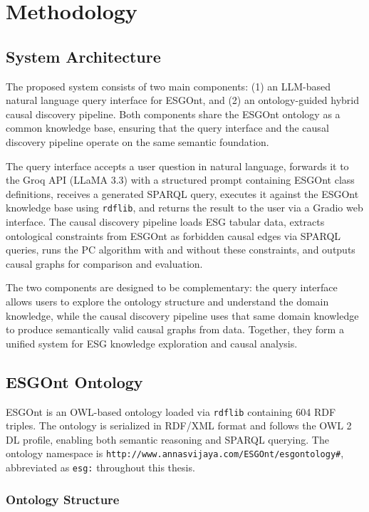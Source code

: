 \documentclass[a4paper,11pt,oneside]{article}
\begin{document}
\section{Methodology}

\subsection{System Architecture}

The proposed system consists of two main components: (1) an LLM-based natural language query interface for ESGOnt, and (2) an ontology-guided hybrid causal discovery pipeline. Both components share the ESGOnt ontology as a common knowledge base, ensuring that the query interface and the causal discovery pipeline operate on the same semantic foundation.

The query interface accepts a user question in natural language, forwards it to the Groq API (LLaMA 3.3) with a structured prompt containing ESGOnt class definitions, receives a generated SPARQL query, executes it against the ESGOnt knowledge base using \texttt{rdflib}, and returns the result to the user via a Gradio web interface. The causal discovery pipeline loads ESG tabular data, extracts ontological constraints from ESGOnt as forbidden causal edges via SPARQL queries, runs the PC algorithm with and without these constraints, and outputs causal graphs for comparison and evaluation.

The two components are designed to be complementary: the query interface allows users to explore the ontology structure and understand the domain knowledge, while the causal discovery pipeline uses that same domain knowledge to produce semantically valid causal graphs from data. Together, they form a unified system for ESG knowledge exploration and causal analysis.

\subsection{ESGOnt Ontology}

ESGOnt is an OWL-based ontology loaded via \texttt{rdflib} containing 604 RDF triples. The ontology is serialized in RDF/XML format and follows the OWL 2 DL profile, enabling both semantic reasoning and SPARQL querying. The ontology namespace is \texttt{http://www.annasvijaya.com/ESGOnt/esgontology\#}, abbreviated as \texttt{esg:} throughout this thesis.

\subsubsection{Ontology Structure}
\end{document}
